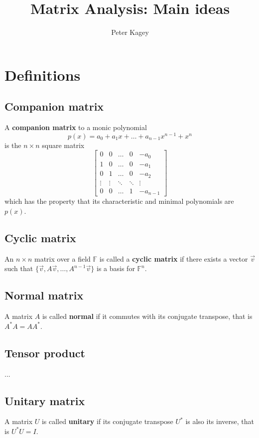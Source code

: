 \documentclass{article}
\begin{document}
\title{Matrix Analysis: Main ideas}
\author{Peter Kagey}

\maketitle

\section{Definitions}
\subsection{Companion matrix}
A \textbf{companion matrix} to a monic polynomial \[
  p(x) = a_0 + a_1x + \dots + a_{n-1}x^{n-1} + x^n
\] is the $n \times n$ square matrix \[
  \begin{bmatrix}
    0 & 0 & \hdots & 0 & -a_0 \\
    1 & 0 & \hdots & 0 & -a_1 \\
    0 & 1 & \hdots & 0 & -a_2 \\
    \vdots & \vdots & \ddots & \ddots & \vdots \\
    0 & 0 & \hdots & 1 & -a_{n-1}
  \end{bmatrix}
\] which has the property that its characteristic and minimal polynomials are $p(x)$.

\subsection{Cyclic matrix}
An $n \times n$ matrix over a field $\mathbb F$ is called a
\textbf{cyclic matrix} if there exists a vector
$\vec v$ such that $\{\vec v, A\vec v, \dots, A^{n-1}\vec v\}$ is a basis for
$\mathbb F^n$.

\subsection{Normal matrix}
A matrix $A$ is called \textbf{normal} if it commutes with its conjugate
transpose, that is $A^*A = AA^*$.

\subsection{Tensor product}
...

\subsection{Unitary matrix}
A matrix $U$ is called \textbf{unitary} if its conjugate transpose $U^*$ is also its
inverse, that is $U^*U = I$.
\end{document}
